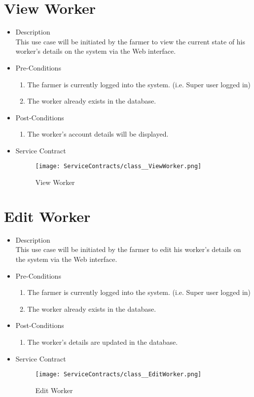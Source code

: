 \documentclass[11pt,fleqn]{book} %
\begin{document}
\section{View Worker}
\begin{itemize}
	\item Description\\
	This use case will be initiated by the farmer to view the current state of his worker’s details on the system via the Web interface.
	\item Pre-Conditions
	\begin{enumerate}
		\item The farmer is currently logged into the system. (i.e. Super user logged in)
		\item The worker already exists in the database.					
	\end{enumerate}
	\item Post-Conditions
	\begin{enumerate}
		\item The worker’s account details will be displayed.
	\end{enumerate}
	\item Service Contract
	\begin{figure}
		\texttt{[image: ServiceContracts/class\_\_ViewWorker.png]}
		\caption{View Worker}
	\end{figure}
\end{itemize}

\section{Edit Worker}
\begin{itemize}
	\item Description\\
	This use case will be initiated by the farmer to edit his worker’s details on the system via the Web interface.
	\item Pre-Conditions
	\begin{enumerate}
		\item The farmer is currently logged into the system. (i.e. Super user logged in)
		\item The worker already exists in the database.					
	\end{enumerate}
	\item Post-Conditions
	\begin{enumerate}
		\item The worker’s details are updated in the database.
	\end{enumerate}
	\item Service Contract
	\begin{figure}
		\texttt{[image: ServiceContracts/class\_\_EditWorker.png]}
		\caption{Edit Worker}
	\end{figure}
\end{itemize}
\end{document}
